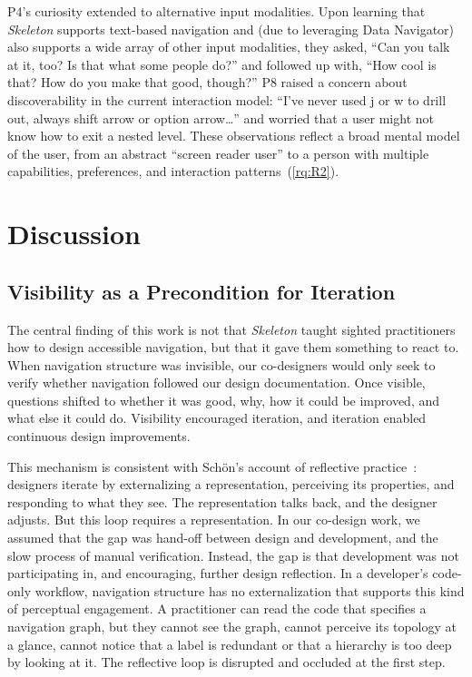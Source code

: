 \documentclass[12pt]{cmuthesis}
\begin{document}
P4's curiosity extended to alternative input modalities. Upon learning that \textit{Skeleton} supports text-based navigation and (due to leveraging Data Navigator) also supports a wide array of other input modalities, they asked, ``Can you talk at it, too? Is that what some people do?'' and followed up with, ``How cool is that? How do you make that good, though?'' P8 raised a concern about discoverability in the current interaction model: ``I've never used j or w to drill out, always shift arrow or option arrow\ldots'' and worried that a user might not know how to exit a nested level. These observations reflect a broad mental model of the user, from an abstract ``screen reader user'' to a person with multiple capabilities, preferences, and interaction patterns~(\ref{rq:R2}).

\section{Discussion}
\label{sec:skelly-discussion}

\subsection{Visibility as a Precondition for Iteration}

The central finding of this work is not that \textit{Skeleton} taught sighted practitioners how to design accessible navigation, but that it gave them something to react to. When navigation structure was invisible, our co-designers would only seek to verify whether navigation followed our design documentation. Once visible, questions shifted to whether it was good, why, how it could be improved, and what else it could do. Visibility encouraged iteration, and iteration enabled continuous design improvements.

This mechanism is consistent with Sch\"on's account of reflective practice~\cite{Schon1996Relective}: designers iterate by externalizing a representation, perceiving its properties, and responding to what they see. The representation talks back, and the designer adjusts. But this loop requires a representation. In our co-design work, we assumed that the gap was hand-off between design and development, and the slow process of manual verification. Instead, the gap is that development was not participating in, and encouraging, further design reflection. In a developer's code-only workflow, navigation structure has no externalization that supports this kind of perceptual engagement. A practitioner can read the code that specifies a navigation graph, but they cannot see the graph, cannot perceive its topology at a glance, cannot notice that a label is redundant or that a hierarchy is too deep by looking at it. The reflective loop is disrupted and occluded at the first step.
\end{document}
